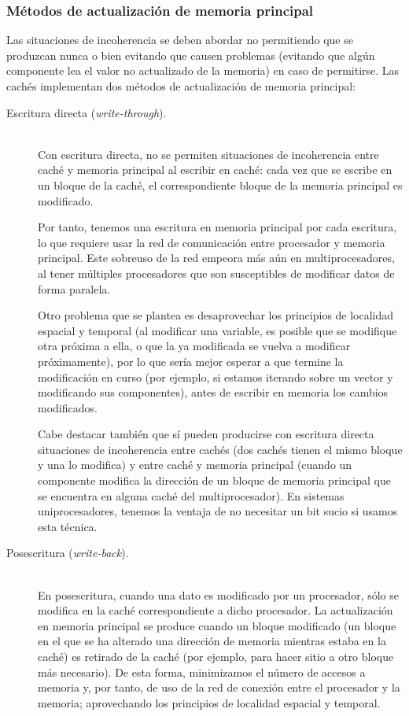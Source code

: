 \subsubsection{Métodos de actualización de memoria principal}
Las situaciones de incoherencia se deben abordar no permitiendo que se produzcan nunca o bien evitando que causen problemas (evitando que algún componente lea el valor no actualizado de la memoria) en caso de permitirse. Las cachés implementan dos métodos de actualización de memoria principal:
\begin{description}
    \item [Escritura directa (\emph{write-through}).]~\\ 
        Con escritura directa, no se permiten situaciones de incoherencia entre caché y memoria principal al escribir en caché: cada vez que se escribe en un bloque de la caché, el correspondiente bloque de la memoria principal es modificado. 

        Por tanto, tenemos una escritura en memoria principal por cada escritura, lo que requiere usar la red de comunicación entre procesador y memoria principal. Este sobreuso de la red empeora más aún en multiprocesadores, al tener múltiples procesadores que son susceptibles de modificar datos de forma paralela.

        Otro problema que se plantea es desaprovechar los principios de localidad espacial y temporal (al modificar una variable, es posible que se modifique otra próxima a ella, o que la ya modificada se vuelva a modificar próximamente), por lo que sería mejor esperar a que termine la modificación en curso (por ejemplo, si estamos iterando sobre un vector y modificando sus componentes), antes de escribir en memoria los cambios modificados.

        Cabe destacar también que sí pueden producirse con escritura directa situaciones de incoherencia entre cachés (dos cachés tienen el mismo bloque y una lo modifica) y entre caché y memoria principal (cuando un componente modifica la dirección de un bloque de memoria principal que se encuentra en alguna caché del multiprocesador). En sistemas uniprocesadores, tenemos la ventaja de no necesitar un bit sucio si usamos esta técnica.

    \item [Posescritura (\emph{write-back}).]~\\
        En posescritura, cuando una dato es modificado por un procesador, sólo se modifica en la caché correspondiente a dicho procesador. La actualización en memoria principal se produce cuando un bloque modificado (un bloque en el que se ha alterado una dirección de memoria mientras estaba en la caché) es retirado de la caché (por ejemplo, para hacer sitio a otro bloque más necesario). De esta forma, minimizamos el número de accesos a memoria y, por tanto, de uso de la red de conexión entre el procesador y la memoria; aprovechando los principios de localidad espacial y temporal.


\end{description}
